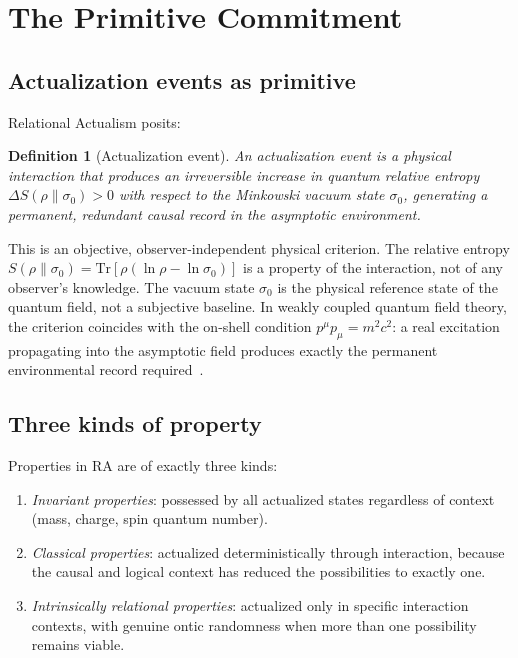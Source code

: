 \documentclass[11pt,twocolumn]{article}
\theoremstyle{plain}
\newtheorem{definition}[theorem]{Definition}
\theoremstyle{remark}
\begin{document}
\section{The Primitive Commitment}
\label{sec:primitive}

\subsection{Actualization events as primitive}

Relational Actualism posits:

\begin{definition}[Actualization event]
An \emph{actualization event} is a physical interaction that produces
an irreversible increase in quantum relative entropy
$\Delta S(\rho\|\sigma_0) > 0$ with respect to the Minkowski vacuum
state $\sigma_0$, generating a permanent, redundant causal record
in the asymptotic environment.
\end{definition}

This is an objective, observer-independent physical criterion.
The relative entropy $S(\rho\|\sigma_0) = \mathrm{Tr}[\rho(\ln\rho
- \ln\sigma_0)]$ is a property of the interaction, not of any
observer's knowledge.
The vacuum state $\sigma_0$ is the physical reference state of
the quantum field, not a subjective baseline.
In weakly coupled quantum field theory, the criterion coincides
with the on-shell condition $p^\mu p_\mu = m^2c^2$: a real excitation
propagating into the asymptotic field produces exactly the permanent
environmental record required~\cite{Sandeman2026P2}.

\subsection{Three kinds of property}

Properties in RA are of exactly three kinds:

\begin{enumerate}[label=(\roman*), noitemsep]
\item \emph{Invariant properties}: possessed by all actualized states
  regardless of context (mass, charge, spin quantum number).
\item \emph{Classical properties}: actualized deterministically through
  interaction, because the causal and logical context has reduced the
  possibilities to exactly one.
\item \emph{Intrinsically relational properties}: actualized only in
  specific interaction contexts, with genuine ontic randomness when
  more than one possibility remains viable.
\end{enumerate}
\end{document}
